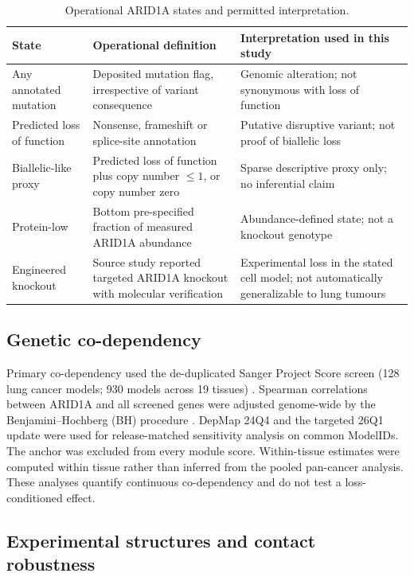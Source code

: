 \documentclass[journal=jprobs,manuscript=article,layout=traditional]{achemso}
\begin{document}
\begin{table}[htbp]
\caption{Operational ARID1A states and permitted interpretation.}\label{tab:states}
\centering
\small
\begin{tabular}{L{0.20\textwidth}L{0.29\textwidth}L{0.39\textwidth}}
\toprule
State & Operational definition & Interpretation used in this study \\
\midrule
Any annotated mutation & Deposited mutation flag, irrespective of variant consequence & Genomic alteration; not synonymous with loss of function \\
Predicted loss of function & Nonsense, frameshift or splice-site annotation & Putative disruptive variant; not proof of biallelic loss \\
Biallelic-like proxy & Predicted loss of function plus copy number $\leq1$, or copy number zero & Sparse descriptive proxy only; no inferential claim \\
Protein-low & Bottom pre-specified fraction of measured ARID1A abundance & Abundance-defined state; not a knockout genotype \\
Engineered knockout & Source study reported targeted ARID1A knockout with molecular verification & Experimental loss in the stated cell model; not automatically generalizable to lung tumours \\
\bottomrule
\end{tabular}
\end{table}

\subsection{Genetic co-dependency}

Primary co-dependency used the de-duplicated Sanger Project Score screen (128 lung cancer models; 930 models across 19 tissues) \citep{behan2019,pacini2021}. Spearman correlations between ARID1A and all screened genes were adjusted genome-wide by the Benjamini--Hochberg (BH) procedure \citep{benjamini1995}. DepMap 24Q4 and the targeted 26Q1 update were used for release-matched sensitivity analysis on common ModelIDs. The anchor was excluded from every module score. Within-tissue estimates were computed within tissue rather than inferred from the pooled pan-cancer analysis. These analyses quantify continuous co-dependency and do not test a loss-conditioned effect.

\subsection{Experimental structures and contact robustness}
\end{document}
